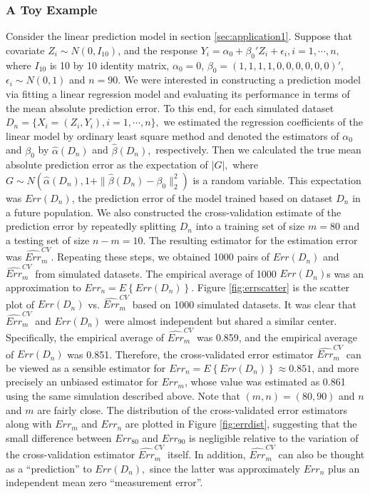 \documentclass[12pt]{article}
\begin{document}
\subsubsection{A Toy Example} \label{sec:toyexample}
Consider the linear prediction model in section \ref{sec:application1}. Suppose that covariate $Z_i\sim N(0, I_{10})$,  and the response
$Y_i=\alpha_0+\beta_0'Z_i+\epsilon_i, i=1,\cdots, n,$
where $I_{10}$ is 10 by 10 identity matrix, $\alpha_0=0$, $\beta_0=(1, 1, 1, 1, 0, 0, 0, 0, 0, 0)',$  $\epsilon_i\sim N(0, 1)$ and $n=90.$  We were interested in constructing a prediction model via fitting a linear regression model and evaluating its performance in terms of the mean absolute prediction error. To this end, for each simulated dataset $D_n=\{X_i=(Z_i, Y_i), i=1,\cdots, n\},$  we estimated the regression coefficients of the linear model by ordinary least square method and denoted the estimators of $\alpha_0$ and $\beta_0$ by $\hat{\alpha}(D_n)$ and $\hat{\beta}(D_n),$ respectively.  Then we calculated the true mean absolute prediction error as the expectation of $|G|,$ where $G\sim N\left(\hat{\alpha}(D_n), 1+\|\hat{\beta}(D_n)-\beta_0\|_2^2\right)$ is a random variable.   This expectation was $Err(D_n)$, the prediction error of the model trained based on dataset $D_n$ in a future population.  We also constructed the cross-validation estimate of the prediction error by repeatedly splitting $D_n$ into a training set of size $m=80$ and a testing set of size $n-m=10.$  The resulting estimator for the estimation error was $\widehat{Err}_m^{CV}.$  Repeating these steps, we obtained 1000 pairs of $Err(D_n)$ and $\widehat{Err}_m^{CV}$ from simulated datasets. The empirical average of 1000 $Err(D_n)$s was an approximation to $Err_n=E\left\{Err(D_n)\right\}.$  Figure \ref{fig:errscatter} is the scatter plot of $Err(D_n)$ vs. $\widehat{Err}^{CV}_m$ based on 1000 simulated datasets. It was clear that $\widehat{Err}^{CV}_m$ and $Err(D_n)$ were almost independent but shared a similar center. Specifically, the empirical average of $\widehat{Err}^{CV}_m$ was 0.859, and the empirical average of $Err(D_n)$ was 0.851. Therefore, the cross-validated error estimator  $\widehat{Err}^{CV}_m$ can be viewed as a sensible estimator for $Err_n=E\left\{Err(D_n)\right\}\approx 0.851$, and more precisely an unbiased estimator for $Err_m$, whose value was estimated as 0.861 using the same simulation described above. Note that $(m, n)=(80, 90)$ and $n$ and $m$ are fairly close. The distribution of the cross-validated error estimators along with $Err_m$ and $Err_n$ are plotted in Figure \ref{fig:errdist}, suggesting that the small difference between $Err_{80}$ and $Err_{90}$ is negligible relative to the variation of the cross-validation estimator $\widehat{Err}^{CV}_m$ itself. In addition, $\widehat{Err}^{CV}_m$ can also be thought as a ``prediction'' to $Err(D_n),$ since the latter was approximately $Err_n$ plus an independent mean zero ``measurement error''.
\end{document}
